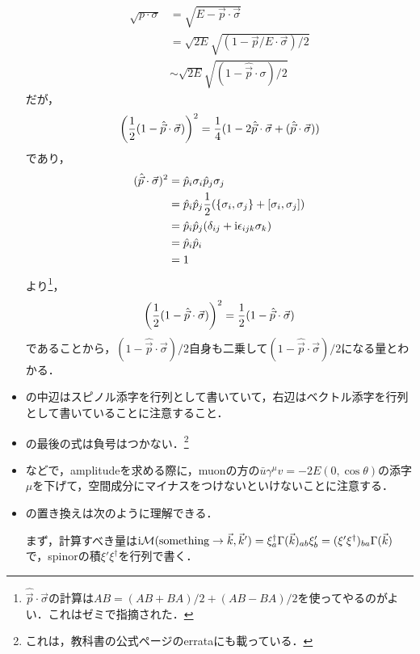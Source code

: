 \begin{itemize}
		\begin{align}
			\sqrt{p\cdot\sigma} &= \sqrt{E - \vec{p}\cdot\vec{\sigma}}\\
								&= \sqrt{2E}\sqrt{(1-\vec{p}/E \cdot \vec{\sigma})/2}\\
								&\sim \sqrt{2E}\sqrt{(1-\hat{\vec{p}}\cdot\sigma)/2}
		\end{align}
		だが，
		\begin{equation}
			\qty(\frac{1}{2}(1-\hat{\vec{p}}\cdot\vec{\sigma}))^2
			= \frac{1}{4}(1-2\hat{\vec{p}}\cdot\vec{\sigma} + (\hat{\vec{p}}\cdot\vec{\sigma}))
		\end{equation}
		であり，
		\begin{align}
			(\hat{\vec{p}}\cdot\vec{\sigma})^2
			&= \hat{p}_i\sigma_i\hat{p}_j\sigma_j\\
			&= \hat{p}_i\hat{p}_j\frac{1}{2}(\{\sigma_i, \sigma_j\} + [\sigma_i, \sigma_j])\\
			&= \hat{p}_i\hat{p}_j (\delta_{ij} + \mathrm{i}\epsilon_{ijk}\sigma_k)\\
			&= \hat{p}_i\hat{p}_i\\
			&= 1
		\end{align}
		より\footnote{$\hat{\vec{p}}\cdot\vec{\sigma}$の計算は$AB = (AB+BA)/2+(AB-BA)/2$を使ってやるのがよい．これはゼミで指摘された．}，
		\begin{equation}
			\qty(\frac{1}{2}(1-\hat{\vec{p}}\cdot\vec{\sigma}))^2 = \frac{1}{2}(1-\hat{\vec{p}}\cdot \vec{\sigma})
		\end{equation}
		であることから，$(1-\hat{\vec{p}}\cdot \vec{\sigma})/2$自身も二乗して$(1-\hat{\vec{p}}\cdot \vec{\sigma})/2$になる量とわかる．
	\item {}の中辺はスピノル添字を行列として書いていて，右辺はベクトル添字を行列として書いていることに注意すること．
	\item {}の最後の式は負号はつかない．\footnote{これは，教科書の公式ページのerrataにも載っている．}
	\item {}などで，amplitudeを求める際に，muonの方の$\bar{u}\gamma^{\mu}v = -2E(0, \cos\theta)$の添字$\mu$を下げて，空間成分にマイナスをつけないといけないことに注意する．
	\item {}の置き換えは次のように理解できる．

		まず，計算すべき量は$\mathrm{i}\mathcal{M}(\text{something} \to \vec{k}, \vec{k}') = \xi^\dagger_a \Gamma(\vec{k})_{ab}\xi'_b = (\xi'\xi^\dagger)_{ba}\Gamma(\vec{k})$で，spinorの積$\xi'\xi^{\dagger}$を行列で書く．


\end{itemize}
